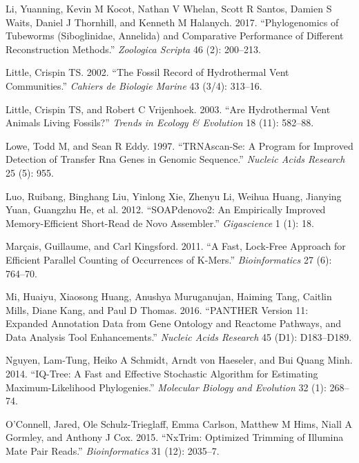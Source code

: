 \documentclass[]{article}
\begin{document}
\leavevmode\hypertarget{ref-li2017phylogenomics}{}%
Li, Yuanning, Kevin M Kocot, Nathan V Whelan, Scott R Santos, Damien S
Waits, Daniel J Thornhill, and Kenneth M Halanych. 2017. ``Phylogenomics
of Tubeworms (Siboglinidae, Annelida) and Comparative Performance of
Different Reconstruction Methods.'' \emph{Zoologica Scripta} 46 (2):
200--213.

\leavevmode\hypertarget{ref-little2002fossil}{}%
Little, Crispin TS. 2002. ``The Fossil Record of Hydrothermal Vent
Communities.'' \emph{Cahiers de Biologie Marine} 43 (3/4): 313--16.

\leavevmode\hypertarget{ref-little2003hydrothermal}{}%
Little, Crispin TS, and Robert C Vrijenhoek. 2003. ``Are Hydrothermal
Vent Animals Living Fossils?'' \emph{Trends in Ecology \& Evolution} 18
(11): 582--88.

\leavevmode\hypertarget{ref-lowe1997trnascan}{}%
Lowe, Todd M, and Sean R Eddy. 1997. ``TRNAscan-Se: A Program for
Improved Detection of Transfer Rna Genes in Genomic Sequence.''
\emph{Nucleic Acids Research} 25 (5): 955.

\leavevmode\hypertarget{ref-luo2012soapdenovo2}{}%
Luo, Ruibang, Binghang Liu, Yinlong Xie, Zhenyu Li, Weihua Huang,
Jianying Yuan, Guangzhu He, et al. 2012. ``SOAPdenovo2: An Empirically
Improved Memory-Efficient Short-Read de Novo Assembler.''
\emph{Gigascience} 1 (1): 18.

\leavevmode\hypertarget{ref-marccais2011fast}{}%
Marçais, Guillaume, and Carl Kingsford. 2011. ``A Fast, Lock-Free
Approach for Efficient Parallel Counting of Occurrences of K-Mers.''
\emph{Bioinformatics} 27 (6): 764--70.

\leavevmode\hypertarget{ref-mi2016panther}{}%
Mi, Huaiyu, Xiaosong Huang, Anushya Muruganujan, Haiming Tang, Caitlin
Mills, Diane Kang, and Paul D Thomas. 2016. ``PANTHER Version 11:
Expanded Annotation Data from Gene Ontology and Reactome Pathways, and
Data Analysis Tool Enhancements.'' \emph{Nucleic Acids Research} 45
(D1): D183--D189.

\leavevmode\hypertarget{ref-nguyen2014iq}{}%
Nguyen, Lam-Tung, Heiko A Schmidt, Arndt von Haeseler, and Bui Quang
Minh. 2014. ``IQ-Tree: A Fast and Effective Stochastic Algorithm for
Estimating Maximum-Likelihood Phylogenies.'' \emph{Molecular Biology and
Evolution} 32 (1): 268--74.

\leavevmode\hypertarget{ref-o2015nxtrim}{}%
O'Connell, Jared, Ole Schulz-Trieglaff, Emma Carlson, Matthew M Hims,
Niall A Gormley, and Anthony J Cox. 2015. ``NxTrim: Optimized Trimming
of Illumina Mate Pair Reads.'' \emph{Bioinformatics} 31 (12): 2035--7.
\end{document}
